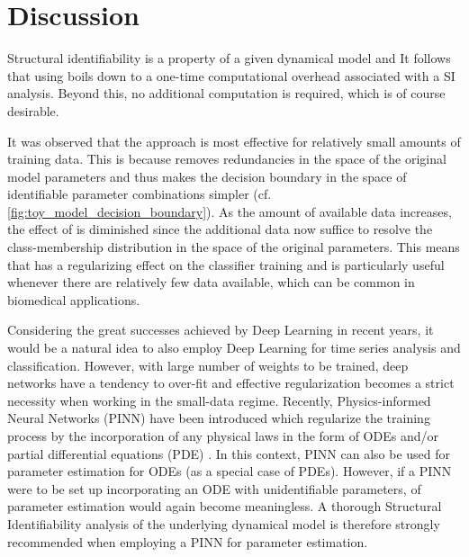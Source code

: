 \section{Discussion}\label{sec:discussion}

Structural identifiability is a property of a given dynamical model and 
It follows that using \myMethod{} boils down to a one-time computational overhead associated with  a SI analysis.
Beyond this, no additional computation is required, which is of course desirable.

It was observed that the \myMethod{} approach is most effective for relatively small amounts of training data. 
This is because \myMethod{} removes redundancies in the space of the original model parameters and thus makes the decision boundary in the space of identifiable parameter combinations simpler (cf. \autoref{fig:toy_model_decision_boundary}).
As the amount of available data increases, the effect of \myMethod{} is diminished since the additional data now suffice to resolve the class-membership distribution in the space of the original parameters. 
This means that \myMethod{} has a regularizing effect on the classifier training and is particularly useful whenever there are relatively few data available, which can be common in biomedical applications. 

Considering the great successes achieved by Deep Learning in recent years, it would be a natural idea to also employ Deep Learning for time series analysis and classification.
However, with  large number of weights to be trained, deep networks have a tendency to over-fit and effective regularization becomes a strict necessity when working in the small-data regime. 
Recently, Physics-informed Neural Networks (PINN) have been introduced which regularize the training process by the incorporation of any physical laws in the form of ODEs and/or partial differential equations (PDE) \cite{raissi2019pinn}.
In this context, PINN can also be used for parameter estimation for ODEs (as a special case of PDEs).
However, if a PINN were to be set up incorporating an ODE with unidentifiable parameters,  of parameter estimation would again become meaningless.
A thorough Structural Identifiability analysis of the underlying dynamical model is therefore strongly recommended when employing a PINN for parameter estimation.

